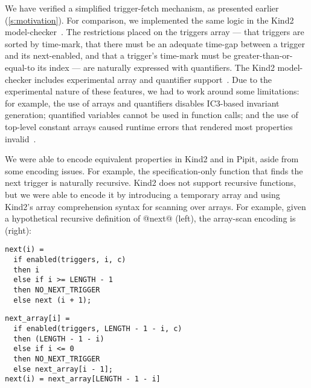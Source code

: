 We have verified a simplified trigger-fetch mechanism, as presented earlier (\autoref{s:motivation}).
For comparison, we implemented the same logic in the Kind2 model-checker~\cite{champion2016kind2}.
The restrictions placed on the triggers array --- that triggers are sorted by time-mark, that there must be an adequate time-gap between a trigger and its next-enabled, and that a trigger's time-mark must be greater-than-or-equal-to its index --- are naturally expressed with quantifiers.
The Kind2 model-checker includes experimental array and quantifier support~\cite{kind2userdoc}.
Due to the experimental nature of these features, we had to work around some limitations: for example, the use of arrays and quantifiers disables IC3-based invariant generation; quantified variables cannot be used in function calls; and the use of top-level constant arrays caused runtime errors that rendered most properties invalid~\cite{kind2024toparray}.

We were able to encode equivalent properties in Kind2 and in Pipit, aside from some encoding issues.
For example, the specification-only function that finds the next trigger is naturally recursive.
Kind2 does not support recursive functions, but we were able to encode it by introducing a temporary array and using Kind2's array comprehension syntax for scanning over arrays.
For example, given a hypothetical recursive definition of @next@ (left), the array-scan encoding is (right):

\begin{minipage}{0.4\textwidth}
\begin{verbatim}
next(i) =
  if enabled(triggers, i, c)
  then i
  else if i >= LENGTH - 1
  then NO_NEXT_TRIGGER
  else next (i + 1);
\end{verbatim}
\end{minipage}
\begin{minipage}{0.6\textwidth}
\begin{verbatim}
next_array[i] =
  if enabled(triggers, LENGTH - 1 - i, c)
  then (LENGTH - 1 - i)
  else if i <= 0
  then NO_NEXT_TRIGGER
  else next_array[i - 1];
next(i) = next_array[LENGTH - 1 - i]

\end{verbatim}
\end{minipage}


